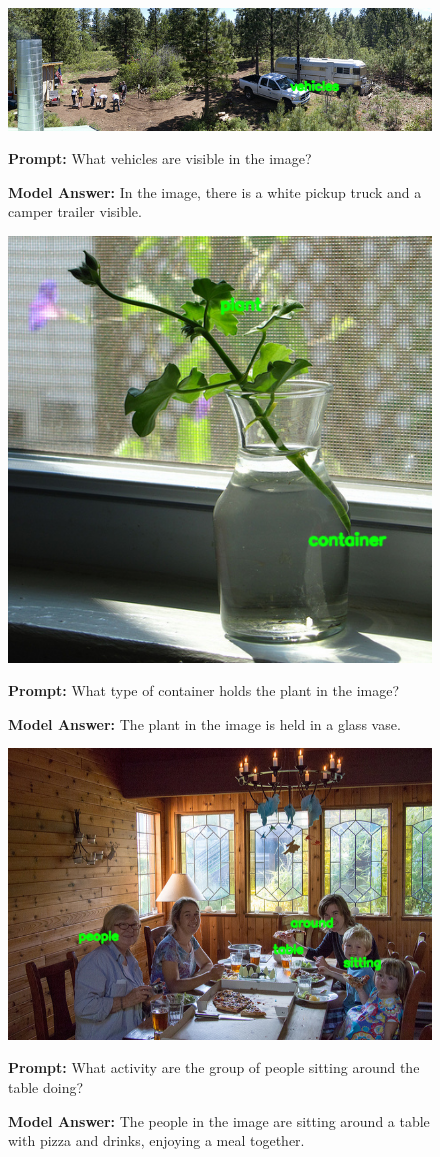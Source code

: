 \documentclass[11pt]{article}
\begin{document}
\begin{figure}[H]
    \centering
    \includegraphics[width=0.9\linewidth]{iclr2026/reordering_263.png}\par
    \vspace{1em}
    \raggedright
    \textbf{Prompt:} What vehicles are visible in the image?
    
    \textbf{Model Answer:} In the image, there is a white pickup truck and a camper trailer visible.
    \label{fig:qwen_loss_plot}
\end{figure}


\begin{figure}[H]
    \centering
    \includegraphics[width=0.5\linewidth]{iclr2026/reordering_301.png}\par
    \vspace{1em}
    \raggedright
    \textbf{Prompt:} What type of container holds the plant in the image?
    
    \textbf{Model Answer:} The plant in the image is held in a glass vase.
\end{figure}

\begin{figure}[H]
    \centering
    \includegraphics[width=0.6\linewidth]{iclr2026/reordering_52.png}\par
    \vspace{1em}
    \raggedright
    \textbf{Prompt:} What activity are the group of people sitting around the table doing?

    \textbf{Model Answer:} The people in the image are sitting around a table with pizza and drinks, enjoying a meal together.
\end{figure}
\end{document}
